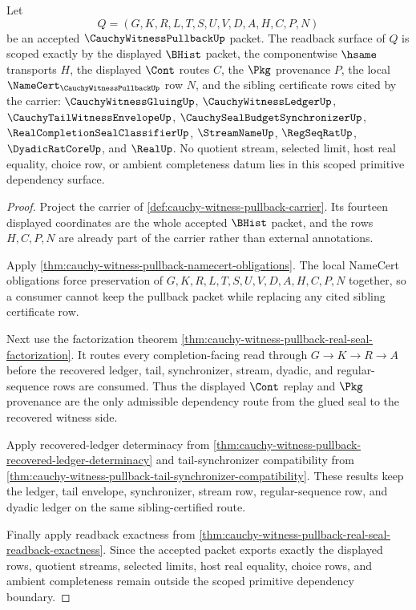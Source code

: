\begin{theorem}
\label{thm:cauchy-witness-pullback-scoped-primitive-dependency-binding}
Let
$$
Q=(G,K,R,L,T,S,U,V,D,A,H,C,P,N)
$$
be an accepted $\CauchyWitnessPullbackUp$ packet. The readback surface of $Q$ is scoped exactly by the displayed $\BHist$ packet, the componentwise $\hsame$ transports $H$, the displayed $\Cont$ routes $C$, the $\Pkg$ provenance $P$, the local $\NameCert_{\CauchyWitnessPullbackUp}$ row $N$, and the sibling certificate rows cited by the carrier: $\CauchyWitnessGluingUp$, $\CauchyWitnessLedgerUp$, $\CauchyTailWitnessEnvelopeUp$, $\CauchySealBudgetSynchronizerUp$, $\RealCompletionSealClassifierUp$, $\StreamNameUp$, $\RegSeqRatUp$, $\DyadicRatCoreUp$, and $\RealUp$. No quotient stream, selected limit, host real equality, choice row, or ambient completeness datum lies in this scoped primitive dependency surface.
\end{theorem}
\begin{proof}
Project the carrier of \autoref{def:cauchy-witness-pullback-carrier}. Its fourteen displayed coordinates are the whole accepted $\BHist$ packet, and the rows $H,C,P,N$ are already part of the carrier rather than external annotations.

Apply \autoref{thm:cauchy-witness-pullback-namecert-obligations}. The local NameCert obligations force preservation of $G,K,R,L,T,S,U,V,D,A,H,C,P,N$ together, so a consumer cannot keep the pullback packet while replacing any cited sibling certificate row.

Next use the factorization theorem \autoref{thm:cauchy-witness-pullback-real-seal-factorization}. It routes every completion-facing read through $G \to K \to R \to A$ before the recovered ledger, tail, synchronizer, stream, dyadic, and regular-sequence rows are consumed. Thus the displayed $\Cont$ replay and $\Pkg$ provenance are the only admissible dependency route from the glued seal to the recovered witness side.

Apply recovered-ledger determinacy from \autoref{thm:cauchy-witness-pullback-recovered-ledger-determinacy} and tail-synchronizer compatibility from \autoref{thm:cauchy-witness-pullback-tail-synchronizer-compatibility}. These results keep the ledger, tail envelope, synchronizer, stream row, regular-sequence row, and dyadic ledger on the same sibling-certified route.

Finally apply readback exactness from \autoref{thm:cauchy-witness-pullback-real-seal-readback-exactness}. Since the accepted packet exports exactly the displayed rows, quotient streams, selected limits, host real equality, choice rows, and ambient completeness remain outside the scoped primitive dependency boundary.
\end{proof}

